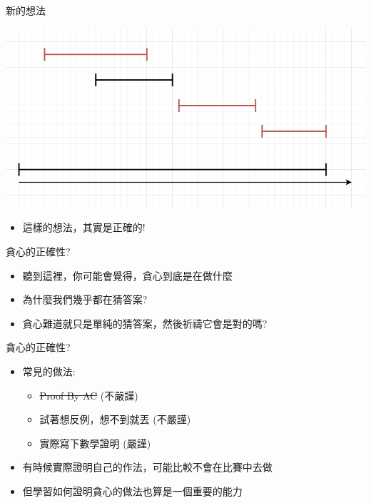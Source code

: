 \documentclass[aspectratio=169]{beamer}
\begin{document}
    \begin{frame}{新的想法}
        \begin{center}
            \includegraphics[scale=0.5]{images/movie_festival_2.png}
        \end{center}
        \begin{itemize}
            \item<2-> 這樣的想法，其實是正確的!
        \end{itemize}
    \end{frame}
    
    \begin{frame}{貪心的正確性?}
        \begin{itemize}
            \item 聽到這裡，你可能會覺得，貪心到底是在做什麼
            \item 為什麼我們幾乎都在猜答案?
            \item<2-> 貪心難道就只是單純的猜答案，然後祈禱它會是對的嗎?
        \end{itemize}
    \end{frame}
    
    \begin{frame}{貪心的正確性?}
        \begin{itemize}
            \item 常見的做法:
                \begin{itemize}
                    \item \sout{Proof By AC} (不嚴謹)
                    \item 試著想反例，想不到就丟 (不嚴謹)
                    \item 實際寫下數學證明 (嚴謹)
                \end{itemize}
            \item<2-> 有時候實際證明自己的作法，可能比較不會在比賽中去做
            \item<2-> 但學習如何證明貪心的做法也算是一個重要的能力
        \end{itemize}
    \end{frame}
    
\end{document}
